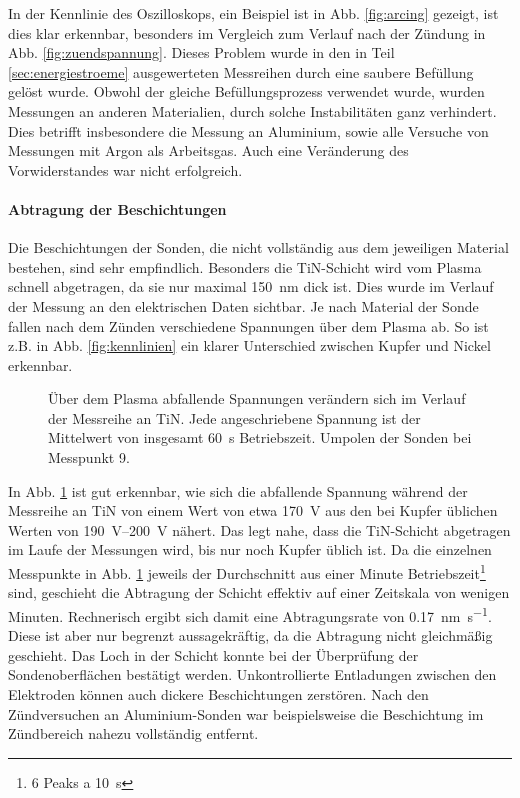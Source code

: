 In der Kennlinie des Oszilloskops, ein Beispiel ist in Abb. \ref{fig:arcing} gezeigt, ist dies klar erkennbar, besonders im Vergleich zum Verlauf nach der Zündung in Abb. \ref{fig:zuendspannung}. Dieses Problem wurde in den in Teil \ref{sec:energiestroeme} ausgewerteten Messreihen durch eine saubere Befüllung gelöst wurde. Obwohl der gleiche Befüllungsprozess verwendet wurde, wurden Messungen an anderen Materialien, durch solche Instabilitäten ganz verhindert. Dies betrifft insbesondere die Messung an Aluminium, sowie alle Versuche von Messungen mit Argon als Arbeitsgas. Auch eine Veränderung des Vorwiderstandes war nicht erfolgreich.

\paragraph{Abtragung der Beschichtungen }
Die Beschichtungen der Sonden, die nicht vollständig aus dem jeweiligen Material bestehen, sind sehr empfindlich. Besonders die TiN-Schicht wird vom Plasma schnell abgetragen, da sie nur maximal \qty{150}{\nm} dick ist. Dies wurde im Verlauf der Messung an den elektrischen Daten sichtbar. Je nach Material der Sonde fallen nach dem Zünden verschiedene Spannungen über dem Plasma ab. So ist z.B. in Abb. \ref{fig:kennlinien} ein klarer Unterschied zwischen Kupfer und Nickel erkennbar. 

\begin{figure}[H]
	\centering
	
	\caption{Über dem Plasma abfallende Spannungen verändern sich im Verlauf der Messreihe an TiN. Jede angeschriebene Spannung ist der Mittelwert von insgesamt \qty{60}{s} Betriebszeit. Umpolen der Sonden bei Messpunkt 9.}
	\label{fig:TiN_spannung}
\end{figure}

In Abb. \ref{fig:TiN_spannung} ist gut erkennbar, wie sich die abfallende Spannung während der Messreihe an TiN von einem Wert von etwa \qty{170}{V} aus den bei Kupfer üblichen Werten von \qtyrange{190}{200}{V} nähert. Das legt nahe, dass die TiN-Schicht abgetragen im Laufe der Messungen wird, bis nur noch Kupfer üblich ist. Da die einzelnen Messpunkte in Abb. \ref{fig:TiN_spannung} jeweils der Durchschnitt aus einer Minute Betriebszeit\footnote{6 Peaks a \qty{10}{s}} sind, geschieht die Abtragung der Schicht effektiv auf einer Zeitskala von wenigen Minuten. Rechnerisch ergibt sich damit eine Abtragungsrate von \qty{0,17}{\nm\per\second}. Diese ist aber nur begrenzt aussagekräftig, da die Abtragung nicht gleichmäßig geschieht. Das Loch in der Schicht konnte bei der Überprüfung der Son\-den\-ober\-flä\-chen bestätigt werden. Unkontrollierte Entladungen zwischen den Elektroden können auch dickere Beschichtungen zerstören. Nach den Zündversuchen an Aluminium-Sonden war beispielsweise die Beschichtung im Zündbereich nahezu vollständig entfernt.
 

